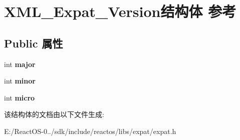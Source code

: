 \hypertarget{struct_x_m_l___expat___version}{}\section{X\+M\+L\+\_\+\+Expat\+\_\+\+Version结构体 参考}
\label{struct_x_m_l___expat___version}
\subsection*{Public 属性}
\begin{DoxyCompactItemize}
\item 
\mbox{\label{struct_x_m_l___expat___version_a0c16da8d497c8eefd86a1bb4c6ea23b5}} 
int {\bfseries major}
\item 
\mbox{\label{struct_x_m_l___expat___version_ab9b1e025090b5f4e7c8f206c72aeb8b6}} 
int {\bfseries minor}
\item 
\mbox{\label{struct_x_m_l___expat___version_ac6b159560f37010366faaf9531f74929}} 
int {\bfseries micro}
\end{DoxyCompactItemize}


该结构体的文档由以下文件生成\+:\begin{DoxyCompactItemize}
\item 
E\+:/\+React\+O\+S-\/0../sdk/include/reactos/libs/expat/expat.\+h\end{DoxyCompactItemize}
